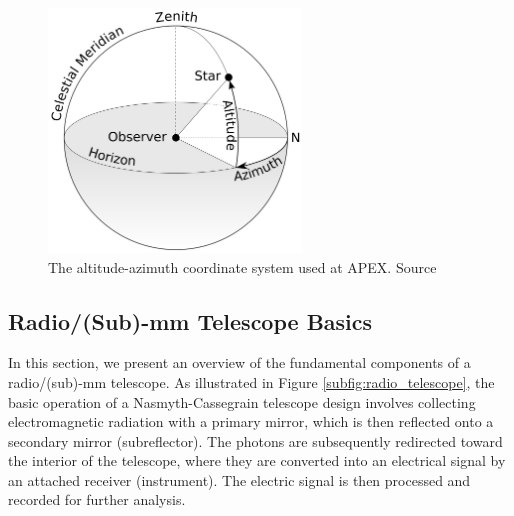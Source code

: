 


\begin{figure}[H]
    \centering
    \includegraphics[width=0.6\textwidth]{Astronomy/Azimuth-Altitude_schematic.png}
    \caption[Altitude-azimuth coordinate system]{The altitude-azimuth coordinate system used at APEX. Source \cite{altazschematic}}
    \label{fig:altaz_coords}
\end{figure}




\subsection{Radio/(Sub)-mm Telescope Basics}
In this section, we present an overview of the fundamental components of a radio/(sub)-mm telescope.
As illustrated in Figure \ref{subfig:radio_telescope}, the basic operation of a Nasmyth-Cassegrain telescope design involves collecting electromagnetic radiation with a primary mirror, which is then reflected onto a secondary mirror (subreflector).
The photons are subsequently redirected toward the interior of the telescope, where they are converted into an electrical signal by an attached receiver (instrument).
The electric signal is then processed and recorded for further analysis.

